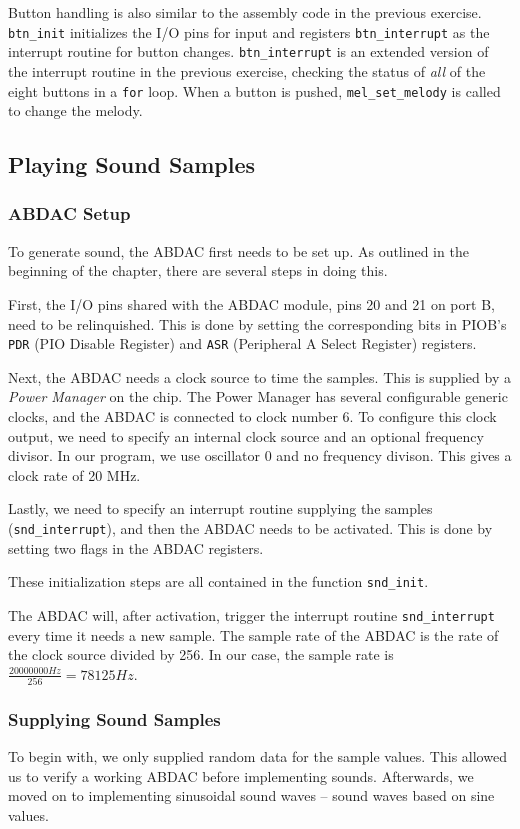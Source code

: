 Button handling is also similar to the assembly code in the previous
exercise. \texttt{btn\_init} initializes the I/O pins for input and
registers \texttt{btn\_interrupt} as the interrupt routine for button
changes. \texttt{btn\_interrupt} is an extended version of the interrupt
routine in the previous exercise, checking the status of \emph{all} of
the eight buttons in a \texttt{for} loop. When a button is pushed,
\texttt{mel\_set\_melody} is called to change the melody.

\subsection{Playing Sound Samples}

\subsubsection{ABDAC Setup}
To generate sound, the ABDAC first needs to be set up. As outlined in
the beginning of the chapter, there are several steps in doing this.

First, the I/O pins shared with the ABDAC module, pins 20 and 21 on port
B, need to be relinquished. This is done by setting the corresponding
bits in PIOB's \texttt{PDR} (PIO Disable Register) and \texttt{ASR}
(Peripheral A Select Register) registers.

Next, the ABDAC needs a clock source to time the samples. This is
supplied by a \emph{Power Manager} on the chip. The Power Manager has
several configurable generic clocks, and the ABDAC is connected to clock
number 6. To configure this clock output, we need to specify an internal
clock source and an optional frequency divisor. In our program, we use
oscillator 0 and no frequency divison. This gives a clock rate of 20
MHz. \cite{ap7000}

Lastly, we need to specify an interrupt routine supplying the samples
(\texttt{snd\_interrupt}), and then the ABDAC needs to be activated.
This is done by setting two flags in the ABDAC registers.

These initialization steps are all contained in the function
\texttt{snd\_init}.

The ABDAC will, after activation, trigger the interrupt routine
\texttt{snd\_interrupt} every time it needs a new sample. The sample
rate of the ABDAC is the rate of the clock source divided by 256. In our
case, the sample rate is $\frac{20000000 Hz}{256}=78125 Hz$.

\subsubsection{Supplying Sound Samples}
To begin with, we only supplied random data for the sample values. This
allowed us to verify a working ABDAC before implementing sounds.
Afterwards, we moved on to implementing sinusoidal sound waves -- sound
waves based on sine values.


